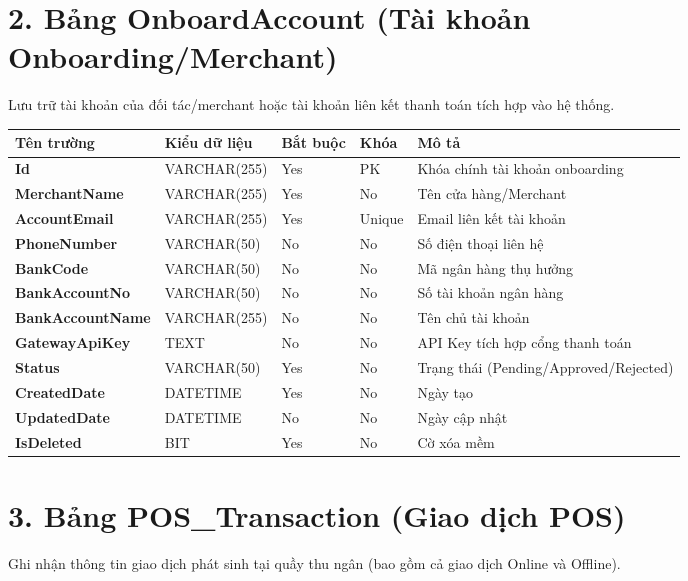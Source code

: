 \documentclass[11pt,a4paper]{article}
\begin{document}
	\section{2. Bảng OnboardAccount (Tài khoản Onboarding/Merchant)}
	Lưu trữ tài khoản của đối tác/merchant hoặc tài khoản liên kết thanh toán tích hợp vào hệ thống.
	
	\begin{tabularx}{\textwidth}{|>{\bfseries}p{3.5cm}|p{2.5cm}|p{1.5cm}|p{1.8cm}|X|}
		\hline
		\rowcolor{tablehead} Tên trường & Kiểu dữ liệu & Bắt buộc & Khóa & Mô tả \\ \hline
		Id & VARCHAR(255) & Yes & PK & Khóa chính tài khoản onboarding \\ \hline
		MerchantName & VARCHAR(255) & Yes & No & Tên cửa hàng/Merchant \\ \hline
		AccountEmail & VARCHAR(255) & Yes & Unique & Email liên kết tài khoản \\ \hline
		PhoneNumber & VARCHAR(50) & No & No & Số điện thoại liên hệ \\ \hline
		BankCode & VARCHAR(50) & No & No & Mã ngân hàng thụ hưởng \\ \hline
		BankAccountNo & VARCHAR(50) & No & No & Số tài khoản ngân hàng \\ \hline
		BankAccountName & VARCHAR(255) & No & No & Tên chủ tài khoản \\ \hline
		GatewayApiKey & TEXT & No & No & API Key tích hợp cổng thanh toán \\ \hline
		Status & VARCHAR(50) & Yes & No & Trạng thái (Pending/Approved/Rejected) \\ \hline
		CreatedDate & DATETIME & Yes & No & Ngày tạo \\ \hline
		UpdatedDate & DATETIME & No & No & Ngày cập nhật \\ \hline
		IsDeleted & BIT & Yes & No & Cờ xóa mềm \\ \hline
	\end{tabularx}
	
	\vspace{1.5em}
	
	\section{3. Bảng POS\_Transaction (Giao dịch POS)}
	Ghi nhận thông tin giao dịch phát sinh tại quầy thu ngân (bao gồm cả giao dịch Online và Offline).
	
\end{document}
